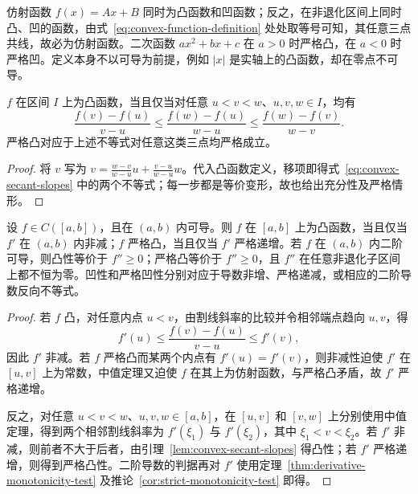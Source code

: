仿射函数 $f(x)=Ax+B$ 同时为凸函数和凹函数；反之，在非退化区间上同时凸、凹的函数，由式~\eqref{eq:convex-function-definition} 处处取等号可知，其任意三点共线，故必为仿射函数。二次函数 $ax^2+bx+c$ 在 $a>0$ 时严格凸，在 $a<0$ 时严格凹。定义本身不以可导为前提，例如 $|x|$ 是实轴上的凸函数，却在零点不可导。

\begin{lemma}[割线斜率的刻画]
\label{lem:convex-secant-slopes}
$f$ 在区间 $I$ 上为凸函数，当且仅当对任意 $u<v<w$、$u,v,w\in I$，均有
\begin{equation}
    \frac{f(v)-f(u)}{v-u}
    \leq\frac{f(w)-f(u)}{w-u}
    \leq\frac{f(w)-f(v)}{w-v}.
    \label{eq:convex-secant-slopes}
\end{equation}
严格凸对应于上述不等式对任意这类三点均严格成立。
\end{lemma}

\begin{proof}
将 $v$ 写为 $v=\frac{w-v}{w-u}u+\frac{v-u}{w-u}w$。代入凸函数定义，移项即得式~\eqref{eq:convex-secant-slopes} 中的两个不等式；每一步都是等价变形，故也给出充分性及严格情形。
\end{proof}

\begin{theorem}[凹凸性的导数判别]
\label{thm:convexity-derivative-tests}
设 $f\in C([a,b])$，且在 $(a,b)$ 内可导。则 $f$ 在 $[a,b]$ 上为凸函数，当且仅当 $f'$ 在 $(a,b)$ 内非减；$f$ 严格凸，当且仅当 $f'$ 严格递增。若 $f$ 在 $(a,b)$ 内二阶可导，则凸性等价于 $f''\geq0$；严格凸等价于 $f''\geq0$，且 $f''$ 在任意非退化子区间上都不恒为零。凹性和严格凹性分别对应于导数非增、严格递减，或相应的二阶导数反向不等式。
\end{theorem}

\begin{proof}
若 $f$ 凸，对任意内点 $u<v$，由割线斜率的比较并令相邻端点趋向 $u,v$，得
\begin{equation}
    f'(u)\leq\frac{f(v)-f(u)}{v-u}\leq f'(v),
    \label{eq:convex-derivative-secant-bounds}
\end{equation}
因此 $f'$ 非减。若 $f$ 严格凸而某两个内点有 $f'(u)=f'(v)$，则非减性迫使 $f'$ 在 $[u,v]$ 上为常数，中值定理又迫使 $f$ 在其上为仿射函数，与严格凸矛盾，故 $f'$ 严格递增。

反之，对任意 $u<v<w$、$u,v,w\in[a,b]$，在 $[u,v]$ 和 $[v,w]$ 上分别使用中值定理，得到两个相邻割线斜率为 $f'(\xi_1)$ 与 $f'(\xi_2)$，其中 $\xi_1<v<\xi_2$。若 $f'$ 非减，则前者不大于后者，由引理~\ref{lem:convex-secant-slopes} 得凸性；若 $f'$ 严格递增，则得到严格凸性。二阶导数的判据再对 $f'$ 使用定理~\ref{thm:derivative-monotonicity-test} 及推论~\ref{cor:strict-monotonicity-test} 即得。
\end{proof}

